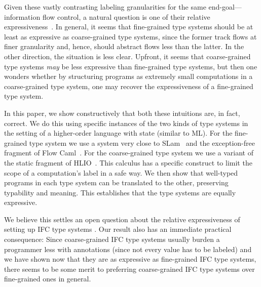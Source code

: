 Given these vastly contrasting labeling granularities for the same
end-goal---information flow control, a natural question is one of
their relative expressiveness~\cite{siglog17-ifcComp}.
In general, it seems that fine-grained type systems should be at least
as expressive as coarse-grained type systems, since the former track
flows at finer granularity  and, hence, should abstract flows less
than the latter. In the other direction, the situation is less
clear. Upfront, it seems that coarse-grained type systems \emph{may}
be less expressive than fine-grained type systems, but then one
wonders whether by structuring programs as extremely small
computations in a coarse-grained type system, one may recover the
expressiveness of a fine-grained type system.

In this paper, we show constructively that both these intuitions are,
in fact, correct. We do this using specific instances of the two kinds
of type systems in the setting of a higher-order language with state
(similar to ML). For the fine-grained type system we use a system very
close to SLam~\cite{popl98-SLAM} and the exception-free fragment of
Flow Caml~\cite{toplas03-flowcaml}. For the coarse-grained type system
we use a variant of the static fragment of
HLIO~\cite{icfp15-HLIO}. This calculus has a specific construct to
limit the scope of a computation's label in a safe way. We then show
that well-typed programs in each type system can be translated to the
other, preserving typability and meaning. This establishes that the
type systems are equally expressive.

We believe this settles an open question about the relative
expressiveness of setting up IFC type systems . Our result also has an immediate practical
consequence: Since coarse-grained IFC type systems usually burden a
programmer less with annotations (since not every value has to be
labeled) and we have shown now that they are as expressive as
fine-grained IFC type systems, there seems to be some merit to
preferring coarse-grained IFC type systems over fine-grained ones in
general.

